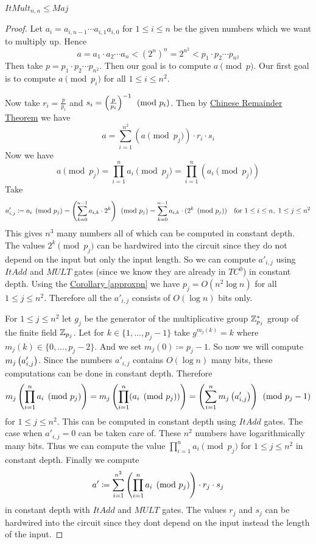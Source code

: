 \begin{theorem}
	$ItMult_{n,n}\leq Maj$
\end{theorem}
\begin{proof}
	Let $a_i=a_{i,n-1}\cdots a_{i,1}a_{i,0}$ for $1\leq i\leq n$ be the given numbers which we want to multiply up. Hence $$a=a_1\cdot a_2\cdots a_n<  (2^n)^n=2^{n^2}<p_1\cdot p_2\cdots p_{n^2}$$Then take $p=p_1\cdot p_2\cdots p_{n^2}$. Then our goal is to compute $a\pmod{p}$. Our first goal is to compute $a\pmod{p_i}$ for all $1\leq i\leq n^2$. 
	
	Now take $r_i=\frac{p}{p_i}$ and $s_i=\left(\frac{p}{p_i}\right)^{-1}\pmod{p_i}$. Then by \hyperref[crt]{Chinese Remainder Theorem} we have $$a=\sum_{i=1}^{n^2}(a\pmod{p_j}) \cdot r_i\cdot s_i$$ Now we have $$a\pmod{p_j}=\prod_{i=1}^na_i\pmod{p_j}=\prod_{i=1}^n (a_i\pmod{p_j})$$Take $$a'_{i,j}\coloneqq a_i\pmod{p_j}=\left(\sum_{k=0}^{n-1}a_{i,k}\cdot  2^k\right)\pmod{p_j}= \sum_{k=0}^{n-1}a_{i,k}\cdot  (2^k\pmod{p_j})\quad\text{for }1\leq i\leq n,\ 1\leq j\leq n^2$$This gives $n^3$ many numbers all of which can be computed in constant depth. The values $2^k\pmod{p_j}$ can be hardwired into the circuit since they do not depend on the input but only the input length. So we can compute $a'_{i,j}$ using $ItAdd$ and $MULT$ gates (since we know they are already in $TC^0$) in constant depth. Using the \hyperref[approxpn]{Corollary \ref{approxpn}} we have $p_j=O(n^2\log n)$ for all $1\leq j\leq n^2$. Therefore all the $a'_{i,j}$ consists of $O(\log n)$ bits only.
	
	For $1\leq j\leq n^2$ let $g_j$ be the generator of the multiplicative group $\mathbb{Z}^*_{p_j}$ group of the finite field $\mathbb{Z}_{p_j}$. Let for $k\in \{1,\dots, p_j-1\}$ take $g^{m_j(k)}=k$ where $m_j(k)\in \{0,\dots, p_j-2\}$. And we set $m_j(0)\coloneqq p_j-1$. So now we will compute $m_j\left(a'_{i,j}\right)$. Since the numbers $a'_{i,j}$ contains $O(\log n)$ many bits, these computations can be done in constant depth. Therefore $$m_j\left( \prod_{i=1}^{n}a_i \pmod{p_j} \right)=m_j\left( \prod_{i=1}^{n}(a_i \pmod{p_j}) \right)=\left( \sum_{i=1}^n m_j\left(a'_{i,j}\right) \right)\pmod{p_j-1}$$ for $1\leq j\leq n^2$. This can be computed in constant depth using $ItAdd$ gates. The case when $a'_{i,j}=0$ can be taken care of. These $n^2$ numbers have logarithmically many bits. Thus we can compute the value $\prod\limits_{i=1}^n a_i\pmod{p_j}$ for $1\leq j\leq n^2$ in constant depth. Finally we compute $$a'\coloneqq \sum_{i=1}^{n^2}\left( \prod\limits_{i=1}^n a_i\pmod{p_j} \right)\cdot r_j\cdot s_j$$ in constant depth with $ItAdd$ and $MULT$ gates. The values $r_j$ and $s_j$ can be hardwired into the circuit since they dont depend on the input instead the length of the input.
	

\end{proof}
